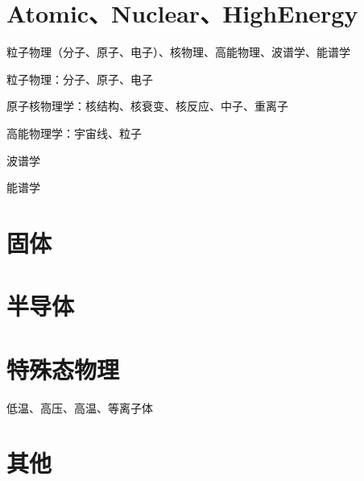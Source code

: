 \section{Atomic、Nuclear、HighEnergy} %

粒子物理（分子、原子、电子）、核物理、高能物理、波谱学、能谱学


粒子物理：分子、原子、电子

原子核物理学：核结构、核衰变、核反应、中子、重离子

高能物理学：宇宙线、粒子

波谱学

能谱学


\section{固体} %



\section{半导体} %


\section{特殊态物理} %

低温、高压、高温、等离子体




\section{其他} 


